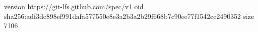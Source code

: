 version https://git-lfs.github.com/spec/v1
oid sha256:adf3dc898ef991dafa577550e8e3a2b3a2b29f668b7c90ee77f1542cc2490352
size 7106
